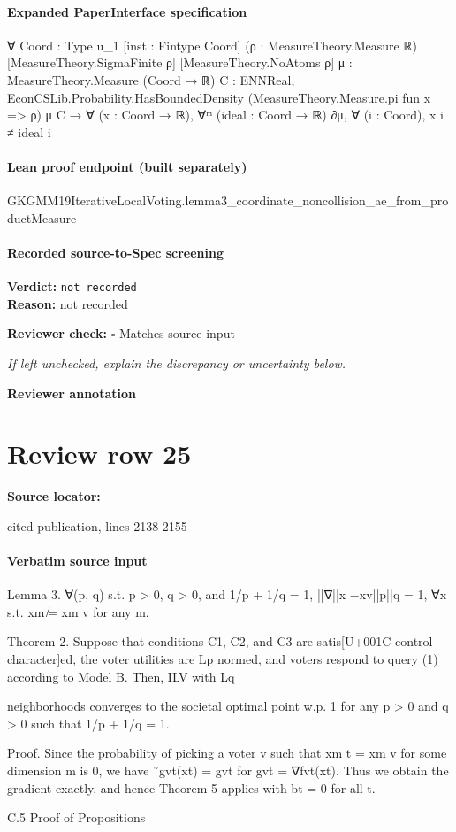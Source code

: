 \documentclass[10pt]{article}
\newcommand{\reviewerbox}{%
  \par\noindent\fbox{\parbox{0.96\linewidth}{\rule{0pt}{0.38in}}}\par
}
\newcommand{\reviewmatch}[1]{%
  \par\noindent\textbf{Reviewer check:} $\square$\; #1\par
  \noindent\emph{If left unchecked, explain the discrepancy or uncertainty below.}\par
}
\begin{document}
\paragraph{Expanded PaperInterface specification}
\begin{ReviewVerbatim}
∀ {Coord : Type u_1} [inst : Fintype Coord] (ρ : MeasureTheory.Measure ℝ) [MeasureTheory.SigmaFinite ρ]
  [MeasureTheory.NoAtoms ρ] {μ : MeasureTheory.Measure (Coord → ℝ)} {C : ENNReal},
  EconCSLib.Probability.HasBoundedDensity (MeasureTheory.Measure.pi fun x => ρ) μ C →
    ∀ (x : Coord → ℝ), ∀ᵐ (ideal : Coord → ℝ) ∂μ, ∀ (i : Coord), x i ≠ ideal i
\end{ReviewVerbatim}

\paragraph{Lean proof endpoint (built separately)}\begin{ReviewVerbatim}
GKGMM19IterativeLocalVoting.lemma3_coordinate_noncollision_ae_from_productMeasure
\end{ReviewVerbatim}

\paragraph{Recorded source-to-Spec screening}
\textbf{Verdict:} \texttt{not recorded}
\\
\textbf{Reason:} not recorded
\reviewmatch{Matches source input}
\noindent\textbf{Reviewer annotation}\par
\reviewerbox
\clearpage
\hypertarget{source-claim-ecf761bbd6bd7ecd}{}
\section*{Review row 25}
\textbf{Source locator:} {\footnotesize\raggedright cited publication, lines 2138-\allowbreak{}2155\par}
\paragraph{Verbatim source input}
\begin{ReviewVerbatim}
Lemma 3. ∀(p, q) s.t. p > 0, q > 0, and 1/p + 1/q = 1, ||∇||x −xv||p||q = 1, ∀x s.t.
xm ̸= xm
v for any m.

Theorem 2. Suppose that conditions C1, C2, and C3 are satis[U+001C control character]ed, the voter utilities are
Lp normed, and voters respond to query (1) according to Model B. Then, ILV with Lq

neighborhoods converges to the societal optimal point w.p. 1 for any p > 0 and q > 0 such
that 1/p + 1/q = 1.

Proof. Since the probability of picking a voter v such that xm
t = xm
v for some dimension m
is 0, we have ˜gvt(xt) = gvt for gvt = ∇fvt(xt). Thus we obtain the gradient exactly, and
hence Theorem 5 applies with bt = 0 for all t.

C.5 Proof of Propositions
\end{ReviewVerbatim}
\end{document}
